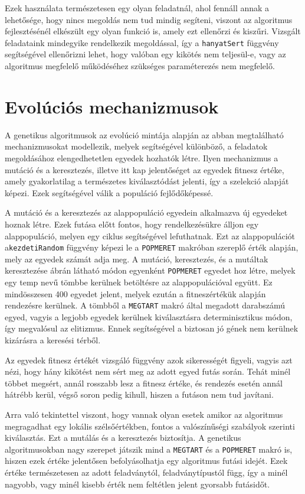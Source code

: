 \documentclass[12pt,a4paper,oneside]{report}
\begin{document}
	Ezek használata természetesen egy olyan feladatnál, ahol fennáll annak a lehetősége, hogy nincs megoldás nem tud mindig segíteni, viszont az algoritmus fejlesztésénél elkészült egy olyan funkció is, amely ezt ellenőrzi és kiszűri.
Vizsgált feladataink mindegyike rendelkezik megoldással, így a \texttt{hanyatSert} függvény segítségével ellenőrizni lehet, hogy valóban egy kikötés nem teljesül-e, vagy az algoritmus megfelelő működéséhez szükséges paraméterezés nem megfelelő.


    \section{Evolúciós mechanizmusok} %
       		A genetikus algoritmusok az evolúció mintája alapján az abban megtalálható mechanizmusokat modellezik, melyek segítségével különböző, a feladatok megoldásához elengedhetetlen egyedek hozhatók létre.
Ilyen mechanizmus a mutáció és a keresztezés, illetve itt kap jelentőséget az egyedek fitnesz értéke, amely gyakorlatilag a természetes kiválasztódást jelenti, így a szelekció alapját képezi. Ezek segítségével válik a populáció fejlődőképessé. 

	A mutáció és a keresztezés az alappopuláció egyedein alkalmazva új egyedeket hoznak létre. Ezek futása előtt fontos, hogy rendelkezésükre álljon egy alappopuláció, melyen egy ciklus segítségével lefuthatnak. Ezt az alappopulációt a\texttt{kezdetiRandom} függvény képezi le a \texttt{POPMERET} makróban szereplő érték alapján, mely az egyedek számát adja meg.
	A mutáció, keresztezés, és a mutáltak keresztezése  ábrán látható módon egyenként \texttt{POPMERET} egyedet hoz létre, melyek egy temp nevű tömbbe kerülnek betöltésre az alappopulációval együtt. Ez mindösszesen 400 egyedet jelent, melyek ezután a fitneszértékük alapján rendezésre kerülnek. A tömbből a \texttt{MEGTART} makró által megadott darabszámú egyed, vagyis a legjobb egyedek kerülnek kiválasztásra determinisztikus módon, így megvalósul az elitizmus. Ennek segítségével a biztosan jó gének nem kerülnek kizárásra a keresési térből. 
	
	Az egyedek fitnesz értékét vizsgáló függvény azok sikerességét figyeli, vagyis azt nézi, hogy hány kikötést nem sért meg az adott egyed futás során. Tehát minél többet megsért, annál rosszabb lesz a fitnesz értéke, és rendezés esetén annál hátrébb kerül, végső soron pedig kihull, hiszen a futáson nem tud javítani.
	
	Arra való tekintettel viszont, hogy vannak olyan esetek amikor az algoritmus megragadhat egy lokális szélsőértékben, fontos a valószínűségi szabályok szerinti kiválasztás. Ezt a mutálás és a keresztezés biztosítja.
A genetikus algoritmusokban nagy szerepet játszik mind a \texttt{MEGTART} és a \texttt{POPMERET} makró is, hiszen ezek értéke jelentősen befolyásolhatja egy algoritmus futási idejét. Ezek értéke természetesen az adott feladványtól, feladványtípustól függ, így a minél nagyobb, vagy minél kisebb érték nem feltétlen jelent gyorsabb futásidőt.
\end{document}
